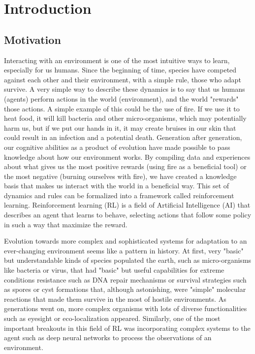 
\chapter{Introduction}
\label{cha:intro}

\section{Motivation}
\label{sec:motivation}
Interacting with an environment is one of the most intuitive ways to learn, especially for us humans. Since the beginning of time, species have competed against each other and their environment, with a simple rule, those who adapt survive. A very simple way to describe these dynamics is to say that us humans (agents) perform actions in the world (environment), and the world "rewards" those actions. A simple example of this could be the use of fire. If we use it to heat food, it will kill bacteria and other micro-organisms, which may potentially harm us, but if we put our hands in it, it may create bruises in our skin that could result in an infection and a potential death. Generation after generation, our cognitive abilities as a product of evolution have made possible to pass knowledge about how our environment works. By compiling data and experiences about what gives us the most positive rewards (using fire as a beneficial tool) or the most negative (burning ourselves with fire), we have created a knowledge basis that makes us interact with the world in a beneficial way. This set of dynamics and rules can be formalized into a framework called reinforcement learning. Reinforcement learning (RL) is a field of Artificial Intelligence (AI) that describes an agent that learns to behave, selecting actions that follow some policy in such a way that maximize the reward. 

Evolution towards more complex and sophisticated systems for adaptation to an ever-changing environment seems like a pattern in history. At first, very "basic" but understandable kinds of species populated the earth, such as micro-organisms like bacteria or virus, that had "basic" but useful capabilities for extreme conditions resistance such as DNA repair mechanisms or survival strategies such as spores or cyst formations that, although astonishing, were "simple" molecular reactions that made them survive in the most of hostile environments. As generations went on, more complex organisms with lots of diverse functionalities such as eyesight or eco-localization appeared. Similarly, one of the most important breakouts in this field of RL was incorporating complex systems to the agent such as deep neural networks to process the observations of an environment. 


